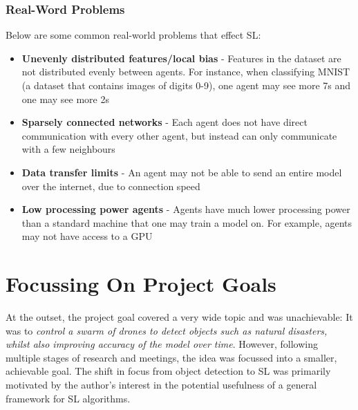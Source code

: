 \subsubsection{Real-Word Problems}
Below are some common real-world problems that effect SL:
\begin{itemize}
	\item \textbf{Unevenly distributed features/local bias} - Features in the dataset are not distributed evenly between agents. For instance, when classifying MNIST (a dataset that contains images of digits 0-9), one agent may see more 7s and one may see more 2s
	\item \textbf{Sparsely connected networks} - Each agent does not have direct communication with every other agent, but instead can only communicate with a few neighbours
	\item \textbf{Data transfer limits} - An agent may not be able to send an entire model over the internet, due to connection speed
	\item \textbf{Low processing power agents} - Agents have much lower processing power than a standard machine that one may train a model on. For example, agents may not have access to a GPU
\end{itemize}	

\section{Focussing On Project Goals}
At the outset, the project goal covered a very wide topic and was unachievable: It was to \emph{control a swarm of drones to detect objects such as natural disasters, whilst also improving accuracy of the model over time}. However, following multiple stages of research and meetings, the idea was focussed into a smaller, achievable goal. The shift in focus from object detection to SL was primarily motivated by the author's interest in the potential usefulness of a general framework for SL algorithms.